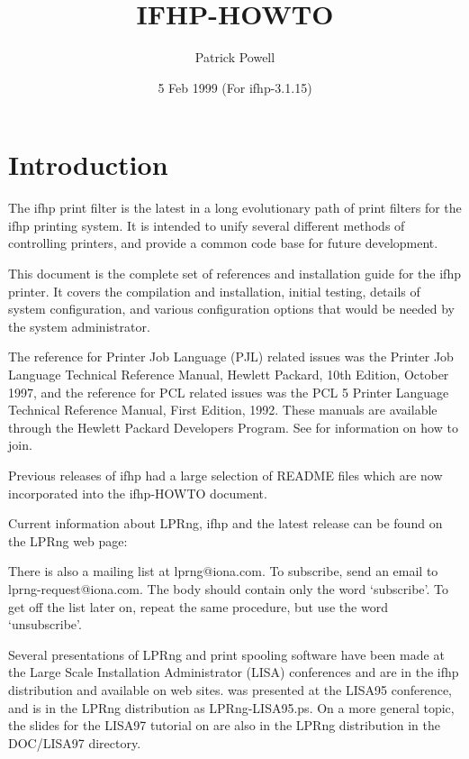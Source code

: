\documentclass[a4paper]{article}
\title{ IFHP-HOWTO}
\author{Patrick Powell
{\ttfamily \onlynameurl{papowell@astart.com}}}
\date{ 5 Feb 1999 (For ifhp-3.1.15)}
\begin{document}
\maketitle
\tableofcontents

\section{Introduction}

The {\ttfamily ifhp} print filter is the latest in a long evolutionary path
of print filters for the {\ttfamily ifhp} printing system.
It is intended to unify several different methods of controlling
printers,  and provide a common code base for future development.

This document is the complete set of references and
installation guide for the {\ttfamily ifhp} printer.
It covers the compilation and installation,
initial testing,
details of system configuration,
and various configuration options that would be needed by the
system administrator.

The reference for Printer Job Language (PJL) related issues
was the Printer Job Language Technical Reference Manual,
Hewlett Packard, 10th Edition, October 1997,
and the reference for PCL related issues was
the PCL 5 Printer Language Technical Reference Manual,
First Edition, 1992.
These manuals are available through the Hewlett Packard Developers Program.
See
for information on how to join.

Previous releases of {\ttfamily ifhp} had a large selection of
{\ttfamily README}
files
which are now incorporated into the {\ttfamily ifhp}-HOWTO document.

Current information
about LPRng, {\ttfamily ifhp} and the latest release can be found on the LPRng web page:


There is also a mailing list at {\ttfamily lprng@iona.com}. To subscribe,
send an email to {\ttfamily lprng-request@iona.com}. The body should contain
only the word `subscribe'. To get off the list later on, repeat the
same procedure, but use the word `unsubscribe'.

Several presentations of LPRng and print spooling software have been made
at the Large Scale Installation Administrator (LISA) conferences and
are in the {\ttfamily ifhp} distribution and available on web sites.
was presented at the LISA95 conference,
and is in the LPRng distribution as LPRng-LISA95.ps.
On a more general topic,
the slides for the LISA97 tutorial on
are also in the LPRng distribution in the DOC/LISA97 directory.
\end{document}
